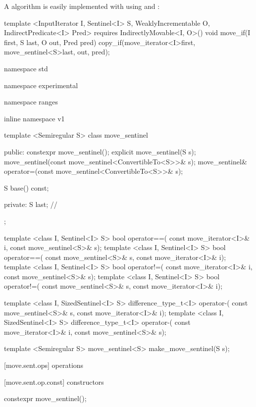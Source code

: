 \pnum
\enterexample A  algorithm is easily implemented with
 using  and :

\begin{codeblock}
template <InputIterator I, Sentinel<I> S, WeaklyIncrementable O,
          IndirectPredicate<I> Pred>
  requires IndirectlyMovable<I, O>()
void move_if(I first, S last, O out, Pred pred)
{
  copy_if(move_iterator<I>{first}, move_sentinel<S>{last}, out, pred);
}
\end{codeblock}

\exitexample

%
\begin{codeblock}
namespace std { namespace experimental { namespace ranges { inline namespace v1 {
  template <Semiregular S>
  class move_sentinel {
  public:
    constexpr move_sentinel();
    explicit move_sentinel(S s);
    move_sentinel(const move_sentinel<ConvertibleTo<S>>& s);
    move_sentinel& operator=(const move_sentinel<ConvertibleTo<S>>& s);

    S base() const;

  private:
    S last; // \expos
  };

  template <class I, Sentinel<I> S>
    bool operator==(
      const move_iterator<I>& i, const move_sentinel<S>& s);
  template <class I, Sentinel<I> S>
    bool operator==(
      const move_sentinel<S>& s, const move_iterator<I>& i);
  template <class I, Sentinel<I> S>
    bool operator!=(
      const move_iterator<I>& i, const move_sentinel<S>& s);
  template <class I, Sentinel<I> S>
    bool operator!=(
      const move_sentinel<S>& s, const move_iterator<I>& i);

  template <class I, SizedSentinel<I> S>
    difference_type_t<I> operator-(
      const move_sentinel<S>& s, const move_iterator<I>& i);
  template <class I, SizedSentinel<I> S>
    difference_type_t<I> operator-(
      const move_iterator<I>& i, const move_sentinel<S>& s);

  template <Semiregular S>
    move_sentinel<S> make_move_sentinel(S s);
}}}}
\end{codeblock}

[move.sent.ops]{ operations}

[move.sent.op.const]{ constructors}

%
\begin{itemdecl}
constexpr move_sentinel();
\end{itemdecl}

